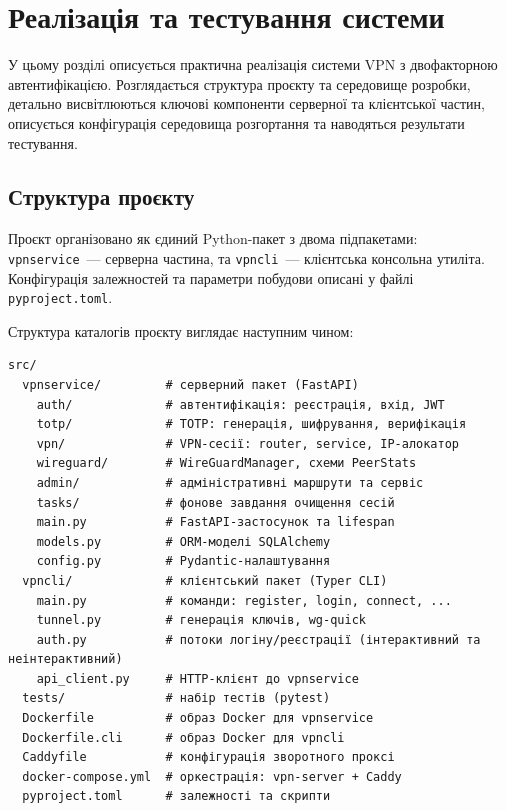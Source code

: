 \chapter{Реалізація та тестування системи}

У цьому розділі описується практична реалізація системи VPN з двофакторною
автентифікацією. Розглядається структура проєкту та середовище розробки,
детально висвітлюються ключові компоненти серверної та клієнтської частин,
описується конфігурація середовища розгортання та наводяться результати тестування.

\section{Структура проєкту}
\label{sec:project_structure}

Проєкт організовано як єдиний Python-пакет з двома підпакетами:
\texttt{vpnservice}~--- серверна частина, та \texttt{vpncli}~--- клієнтська
консольна утиліта. Конфігурація залежностей та параметри побудови описані у файлі \texttt{pyproject.toml}.

Структура каталогів проєкту виглядає наступним чином:

\begin{lstlisting}[style=mystyle, caption={Структура каталогів проєкту},
  label={lst:project_tree}]
src/
  vpnservice/         # серверний пакет (FastAPI)
    auth/             # автентифікація: реєстрація, вхід, JWT
    totp/             # TOTP: генерація, шифрування, верифікація
    vpn/              # VPN-сесії: router, service, IP-алокатор
    wireguard/        # WireGuardManager, схеми PeerStats
    admin/            # адміністративні маршрути та сервіс
    tasks/            # фонове завдання очищення сесій
    main.py           # FastAPI-застосунок та lifespan
    models.py         # ORM-моделі SQLAlchemy
    config.py         # Pydantic-налаштування
  vpncli/             # клієнтський пакет (Typer CLI)
    main.py           # команди: register, login, connect, ...
    tunnel.py         # генерація ключів, wg-quick
    auth.py           # потоки логіну/реєстрації (інтерактивний та неінтерактивний)
    api_client.py     # HTTP-клієнт до vpnservice
  tests/              # набір тестів (pytest)
  Dockerfile          # образ Docker для vpnservice
  Dockerfile.cli      # образ Docker для vpncli
  Caddyfile           # конфігурація зворотного проксі
  docker-compose.yml  # оркестрація: vpn-server + Caddy
  pyproject.toml      # залежності та скрипти
\end{lstlisting}


